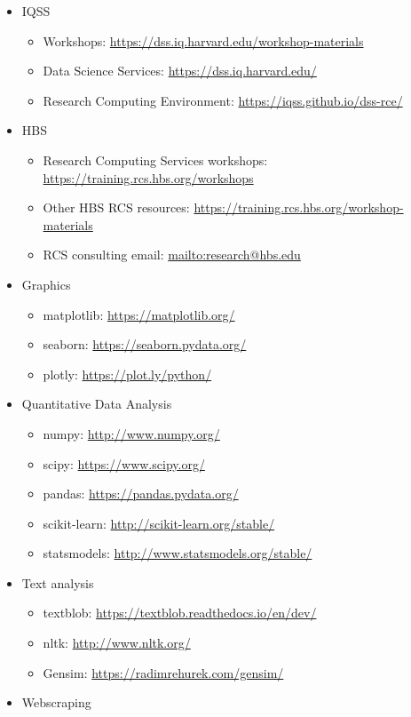 \documentclass[]{book}
\providecommand{\tightlist}{%
  \setlength{\itemsep}{0pt}\setlength{\parskip}{0pt}}
\begin{document}
\begin{itemize}
\tightlist
\item
  IQSS

  \begin{itemize}
  \tightlist
  \item
    Workshops: \url{https://dss.iq.harvard.edu/workshop-materials}
  \item
    Data Science Services: \url{https://dss.iq.harvard.edu/}
  \item
    Research Computing Environment: \url{https://iqss.github.io/dss-rce/}
  \end{itemize}
\item
  HBS

  \begin{itemize}
  \tightlist
  \item
    Research Computing Services workshops: \url{https://training.rcs.hbs.org/workshops}
  \item
    Other HBS RCS resources: \url{https://training.rcs.hbs.org/workshop-materials}
  \item
    RCS consulting email: \url{mailto:research@hbs.edu}
  \end{itemize}
\item
  Graphics

  \begin{itemize}
  \tightlist
  \item
    matplotlib: \url{https://matplotlib.org/}
  \item
    seaborn: \url{https://seaborn.pydata.org/}
  \item
    plotly: \url{https://plot.ly/python/}
  \end{itemize}
\item
  Quantitative Data Analysis

  \begin{itemize}
  \tightlist
  \item
    numpy: \url{http://www.numpy.org/}
  \item
    scipy: \url{https://www.scipy.org/}
  \item
    pandas: \url{https://pandas.pydata.org/}
  \item
    scikit-learn: \url{http://scikit-learn.org/stable/}
  \item
    statsmodels: \url{http://www.statsmodels.org/stable/}
  \end{itemize}
\item
  Text analysis

  \begin{itemize}
  \tightlist
  \item
    textblob: \url{https://textblob.readthedocs.io/en/dev/}
  \item
    nltk: \url{http://www.nltk.org/}
  \item
    Gensim: \url{https://radimrehurek.com/gensim/}
  \end{itemize}
\item
  Webscraping


\end{itemize}
\end{document}
